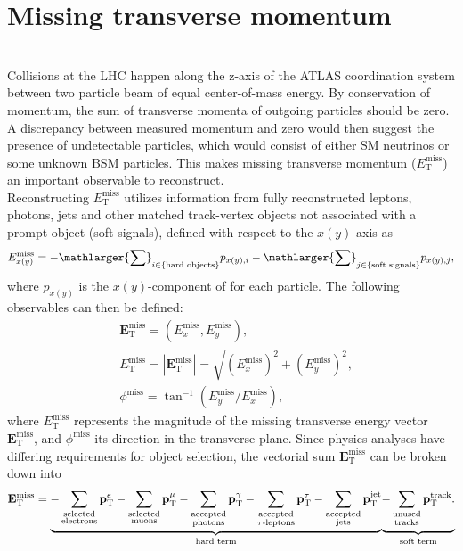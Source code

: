\documentclass[../thesis.tex]{subfiles}
\begin{document}
\section{Missing transverse momentum}
\label{sec:met}
\citep{reco:met}\\
Collisions at the LHC happen along the z-axis of the ATLAS coordination system between two particle beam of equal center-of-mass energy. By conservation of momentum, the sum of transverse momenta of outgoing particles should be zero. A discrepancy between measured momentum and zero would then suggest the presence of undetectable particles, which would consist of either SM neutrinos or some unknown BSM particles. This makes missing transverse momentum ($E_\mathrm{T}^\mathrm{miss}$) an important observable to reconstruct.\\
Reconstructing $E_\mathrm{T}^\mathrm{miss}$ utilizes information from fully reconstructed leptons, photons, jets and other matched track-vertex objects not associated with a prompt object (soft signals), defined with respect to the $x (y)$-axis as
\begin{equation}
E^\mathrm{miss}_{x (y)} = -\mathlarger{\sum}_{i \in \{\text{hard objects}\}} p_{x (y),i} -\mathlarger{\sum}_{j \in \{\text{soft signals}\}} p_{x (y),j},
\end{equation}
where $p_{x(y)}$ is the $x(y)$-component of \pT for each particle. The following observables can then be defined:
\begin{align}
& \mathbf{E}_\mathrm{T}^\mathrm{miss}=(E^\mathrm{miss}_{x},E^\mathrm{miss}_{y}),\\
& E_\mathrm{T}^\mathrm{miss}=|\mathbf{E}_\mathrm{T}^\mathrm{miss}|=\sqrt{(E^\mathrm{miss}_{x})^2+(E^\mathrm{miss}_{y})^2},\\
& \phi^\mathrm{miss}=\tan^{-1}(E^\mathrm{miss}_{y}/E^\mathrm{miss}_{x}),
\end{align}
where $E_\mathrm{T}^\mathrm{miss}$ represents the magnitude of the missing transverse energy vector $\mathbf{E}_\mathrm{T}^\mathrm{miss}$, and $\phi^\mathrm{miss}$ its direction in the transverse plane. Since physics analyses have differing requirements for object selection, the vectorial sum $\mathbf{E}_\mathrm{T}^\mathrm{miss}$ can be broken down into
\begin{equation}
\mathbf{E}_\mathrm{T}^\mathrm{miss} =
{\underbrace{
-\sum_{\substack{\text{selected}\\ \text{electrons}}} \mathbf{p}_\mathrm{T}^e
-\sum_{\substack{\text{selected}\\ \text{muons}}} \mathbf{p}_\mathrm{T}^\mu
-\sum_{\substack{\text{accepted}\\ \text{photons}}} \mathbf{p}_\mathrm{T}^\gamma
-\sum_{\substack{\text{accepted}\\ \text{\ensuremath{\tau}-leptons}}} \mathbf{p}_\mathrm{T}^\tau
-\sum_{\substack{\text{accepted}\\ \text{jets}}} \mathbf{p}_\mathrm{T}^\mathrm{jet}
}_\text{hard term}}
{\underbrace{
-\sum_{\substack{\vphantom{p}\text{unused}\\ \vphantom{p}\text{tracks}}} \mathbf{p}_\mathrm{T}^\mathrm{track}.
}_\text{soft term}}
\end{equation}
\end{document}
